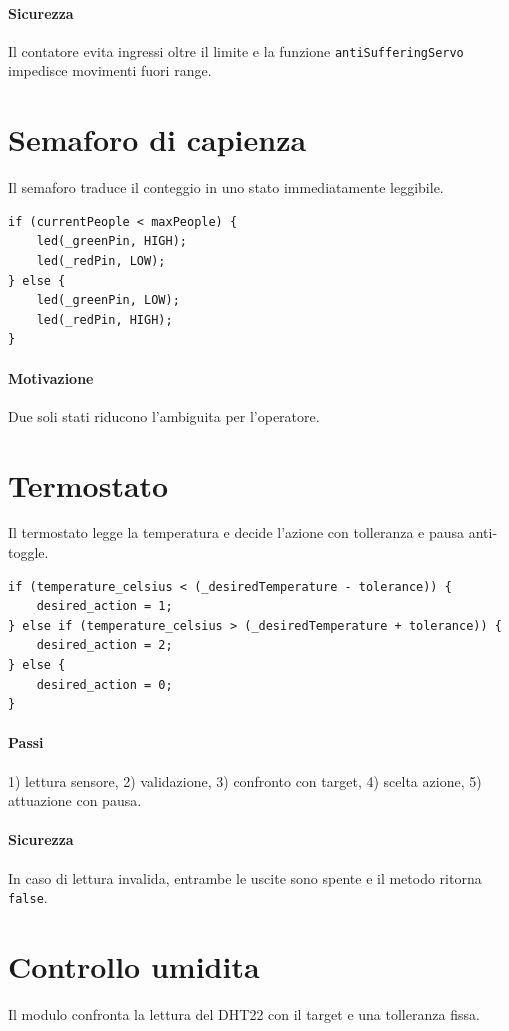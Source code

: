 \paragraph{Sicurezza} Il contatore evita ingressi oltre il limite e la funzione \texttt{antiSufferingServo} impedisce movimenti fuori range.

\section{Semaforo di capienza}
Il semaforo traduce il conteggio in uno stato immediatamente leggibile.

\begin{lstlisting}[style=cppstyle]
if (currentPeople < maxPeople) {
    led(_greenPin, HIGH);
    led(_redPin, LOW);
} else {
    led(_greenPin, LOW);
    led(_redPin, HIGH);
}
\end{lstlisting}

\paragraph{Motivazione} Due soli stati riducono l'ambiguita per l'operatore.

\section{Termostato}
Il termostato legge la temperatura e decide l'azione con tolleranza e pausa anti-toggle.

\begin{lstlisting}[style=cppstyle]
if (temperature_celsius < (_desiredTemperature - tolerance)) {
    desired_action = 1;
} else if (temperature_celsius > (_desiredTemperature + tolerance)) {
    desired_action = 2;
} else {
    desired_action = 0;
}
\end{lstlisting}

\paragraph{Passi} 1) lettura sensore, 2) validazione, 3) confronto con target, 4) scelta azione, 5) attuazione con pausa.

\paragraph{Sicurezza} In caso di lettura invalida, entrambe le uscite sono spente e il metodo ritorna \texttt{false}.

\section{Controllo umidita}
Il modulo confronta la lettura del DHT22 con il target e una tolleranza fissa.

